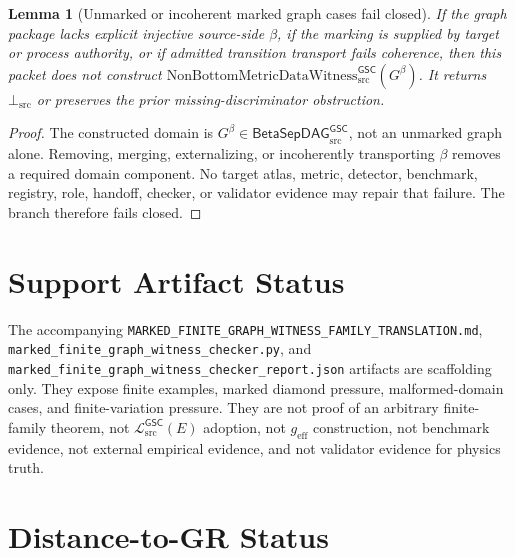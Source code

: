 \documentclass[11pt]{article}
\newcommand{\Witness}{\mathrm{NonBottomMetricDataWitness}_{\mathrm{src}}^{\mathsf{GSC}}}
\newcommand{\MetricData}{\mathcal{L}_{\mathrm{src}}^{\mathsf{GSC}}}
\newcommand{\BottomSrc}{\bot_{\mathrm{src}}}
\newcommand{\geff}{g_{\mathrm{eff}}}
\newcommand{\BetaGraph}{\mathsf{BetaSepDAG}_{\mathrm{src}}^{\mathsf{GSC}}}
\newtheorem{lemma}{Lemma}
\begin{document}
\begin{lemma}[Unmarked or incoherent marked graph cases fail closed]
If the graph package lacks explicit injective source-side \(\beta\), if the
marking is supplied by target or process authority, or if admitted transition
transport fails coherence, then this packet does not construct
\(\Witness(G^\beta)\). It returns \(\BottomSrc\) or preserves the prior
missing-discriminator obstruction.
\end{lemma}

\begin{proof}
The constructed domain is \(G^\beta\in\BetaGraph\), not an unmarked graph
alone. Removing, merging, externalizing, or incoherently transporting \(\beta\)
removes a required domain component. No target atlas, metric, detector,
benchmark, registry, role, handoff, checker, or validator evidence may repair
that failure. The branch therefore fails closed.
\end{proof}

\section{Support Artifact Status}

The accompanying
\texttt{MARKED\_FINITE\_GRAPH\_WITNESS\_FAMILY\_TRANSLATION.md},
\texttt{marked\_finite\_graph\_witness\_checker.py}, and
\texttt{marked\_finite\_graph\_witness\_checker\_report.json} artifacts are
scaffolding only. They expose finite examples, marked diamond pressure,
malformed-domain cases, and finite-variation pressure. They are not proof of
an arbitrary finite-family theorem, not \(\MetricData(E)\) adoption, not
\(\geff\) construction, not benchmark evidence, not external empirical
evidence, and not validator evidence for physics truth.

\section{Distance-to-GR Status}
\end{document}

